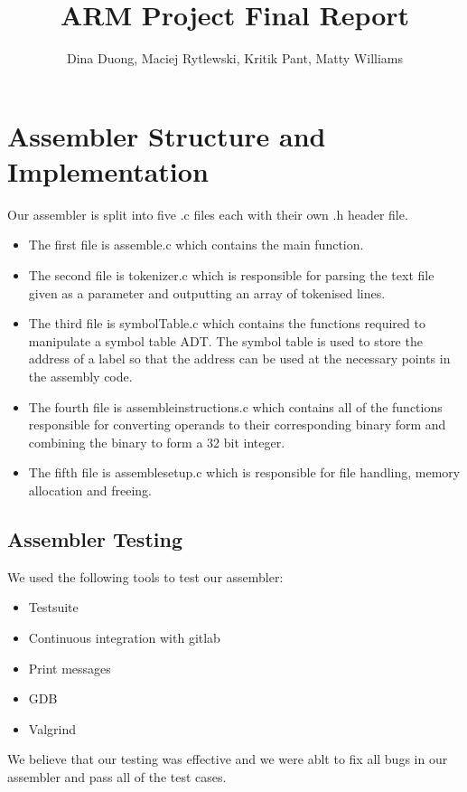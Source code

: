 \documentclass[11pt]{article}
\begin{document}
\title{
    \vspace{-2cm}
    ARM Project Final Report}
\author{Dina Duong, Maciej Rytlewski, Kritik Pant, Matty Williams}

\maketitle

\section{Assembler Structure and Implementation}

Our assembler is split into five .c files each with their own .h header file.

\begin{itemize}
    \item The first file is assemble.c which contains the main function.
    \item The second file is tokenizer.c which is responsible for parsing the text file given as a parameter and outputting an array of tokenised lines.
    \item The third file is symbolTable.c which contains the functions required to manipulate a symbol table ADT. The symbol table is used to store the address of a label so that the address can be used at the necessary points in the assembly code.
    \item The fourth file is assembleinstructions.c which contains all of the functions responsible for converting operands to their corresponding binary form and combining the binary to form a 32 bit integer.
    \item The fifth file is assemblesetup.c which is responsible for file handling, memory allocation and freeing. 
\end{itemize}

\subsection{Assembler Testing}
We used the following tools to test our assembler:
\begin{itemize}
    \item Testsuite
    \item Continuous integration with gitlab
    \item Print messages
    \item GDB
    \item Valgrind
\end{itemize}
We believe that our testing was effective and we were ablt to fix all bugs in our assembler and pass all of the test cases.
\end{document}
